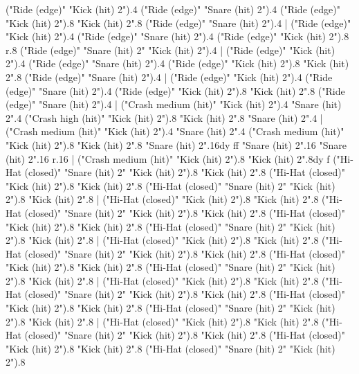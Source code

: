       ("Ride (edge)" "Kick (hit) 2").4
      ("Ride (edge)" "Snare (hit) 2").4
      ("Ride (edge)" "Kick (hit) 2").8
      "Kick (hit) 2".8
      ("Ride (edge)" "Snare (hit) 2").4
    |
      ("Ride (edge)" "Kick (hit) 2").4
      ("Ride (edge)" "Snare (hit) 2").4
      ("Ride (edge)" "Kick (hit) 2").8
      r.8
      ("Ride (edge)" "Snare (hit) 2" "Kick (hit) 2").4
    |
      ("Ride (edge)" "Kick (hit) 2").4
      ("Ride (edge)" "Snare (hit) 2").4
      ("Ride (edge)" "Kick (hit) 2").8
      "Kick (hit) 2".8
      ("Ride (edge)" "Snare (hit) 2").4
    |
      ("Ride (edge)" "Kick (hit) 2").4
      ("Ride (edge)" "Snare (hit) 2").4
      ("Ride (edge)" "Kick (hit) 2").8
      "Kick (hit) 2".8
      ("Ride (edge)" "Snare (hit) 2").4
    |
      ("Crash medium (hit)" "Kick (hit) 2").4
      "Snare (hit) 2".4
      ("Crash high (hit)" "Kick (hit) 2").8
      "Kick (hit) 2".8
      "Snare (hit) 2".4
    |
      ("Crash medium (hit)" "Kick (hit) 2").4
      "Snare (hit) 2".4
      ("Crash medium (hit)" "Kick (hit) 2").8
      "Kick (hit) 2".8
      "Snare (hit) 2".16{dy ff}
      "Snare (hit) 2".16
      "Snare (hit) 2".16
      r.16
    |
      ("Crash medium (hit)" "Kick (hit) 2").8
      "Kick (hit) 2".8{dy f}
      ("Hi-Hat (closed)" "Snare (hit) 2" "Kick (hit) 2").8
      "Kick (hit) 2".8
      ("Hi-Hat (closed)" "Kick (hit) 2").8
      "Kick (hit) 2".8
      ("Hi-Hat (closed)" "Snare (hit) 2" "Kick (hit) 2").8
      "Kick (hit) 2".8
    |
      ("Hi-Hat (closed)" "Kick (hit) 2").8
      "Kick (hit) 2".8
      ("Hi-Hat (closed)" "Snare (hit) 2" "Kick (hit) 2").8
      "Kick (hit) 2".8
      ("Hi-Hat (closed)" "Kick (hit) 2").8
      "Kick (hit) 2".8
      ("Hi-Hat (closed)" "Snare (hit) 2" "Kick (hit) 2").8
      "Kick (hit) 2".8
    |
      ("Hi-Hat (closed)" "Kick (hit) 2").8
      "Kick (hit) 2".8
      ("Hi-Hat (closed)" "Snare (hit) 2" "Kick (hit) 2").8
      "Kick (hit) 2".8
      ("Hi-Hat (closed)" "Kick (hit) 2").8
      "Kick (hit) 2".8
      ("Hi-Hat (closed)" "Snare (hit) 2" "Kick (hit) 2").8
      "Kick (hit) 2".8
    |
      ("Hi-Hat (closed)" "Kick (hit) 2").8
      "Kick (hit) 2".8
      ("Hi-Hat (closed)" "Snare (hit) 2" "Kick (hit) 2").8
      "Kick (hit) 2".8
      ("Hi-Hat (closed)" "Kick (hit) 2").8
      "Kick (hit) 2".8
      ("Hi-Hat (closed)" "Snare (hit) 2" "Kick (hit) 2").8
      "Kick (hit) 2".8
    |
      ("Hi-Hat (closed)" "Kick (hit) 2").8
      "Kick (hit) 2".8
      ("Hi-Hat (closed)" "Snare (hit) 2" "Kick (hit) 2").8
      "Kick (hit) 2".8
      ("Hi-Hat (closed)" "Kick (hit) 2").8
      "Kick (hit) 2".8
      ("Hi-Hat (closed)" "Snare (hit) 2" "Kick (hit) 2").8
